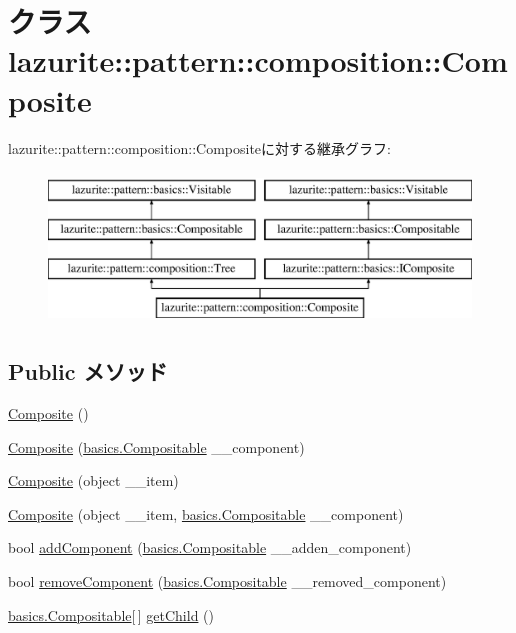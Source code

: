 \hypertarget{classlazurite_1_1pattern_1_1composition_1_1_composite}{
\section{クラス lazurite::pattern::composition::Composite}
\label{classlazurite_1_1pattern_1_1composition_1_1_composite}
}
lazurite::pattern::composition::Compositeに対する継承グラフ:\begin{figure}[H]
\begin{center}
\leavevmode
\includegraphics[height=4cm]{classlazurite_1_1pattern_1_1composition_1_1_composite}
\end{center}
\end{figure}
\subsection*{Public メソッド}
\begin{DoxyCompactItemize}
\item 
\hyperlink{classlazurite_1_1pattern_1_1composition_1_1_composite_add95ff2ba65d1b7c1ca915de4b22d5f9}{Composite} ()
\item 
\hyperlink{classlazurite_1_1pattern_1_1composition_1_1_composite_a04db62f594857a07f40800b11d546841}{Composite} (\hyperlink{interfacelazurite_1_1pattern_1_1basics_1_1_compositable}{basics.Compositable} \_\-\_\-component)
\item 
\hyperlink{classlazurite_1_1pattern_1_1composition_1_1_composite_a5f487093fb2ea35732eff5b4dd98a98a}{Composite} (object \_\-\_\-item)
\item 
\hyperlink{classlazurite_1_1pattern_1_1composition_1_1_composite_affbe464e61dc6535a6b87956a73eac9e}{Composite} (object \_\-\_\-item, \hyperlink{interfacelazurite_1_1pattern_1_1basics_1_1_compositable}{basics.Compositable} \_\-\_\-component)
\item 
bool \hyperlink{classlazurite_1_1pattern_1_1composition_1_1_composite_af2e8b23c8776eb5f09f98c32d1044698}{addComponent} (\hyperlink{interfacelazurite_1_1pattern_1_1basics_1_1_compositable}{basics.Compositable} \_\-\_\-adden\_\-component)
\item 
bool \hyperlink{classlazurite_1_1pattern_1_1composition_1_1_composite_a22844ad840310dcc0952756e45faf5f1}{removeComponent} (\hyperlink{interfacelazurite_1_1pattern_1_1basics_1_1_compositable}{basics.Compositable} \_\-\_\-removed\_\-component)
\item 
\hyperlink{interfacelazurite_1_1pattern_1_1basics_1_1_compositable}{basics.Compositable}\mbox{[}$\,$\mbox{]} \hyperlink{classlazurite_1_1pattern_1_1composition_1_1_composite_a41bcfd17d90cfdae6befc1839657ee73}{getChild} ()
\end{DoxyCompactItemize}
